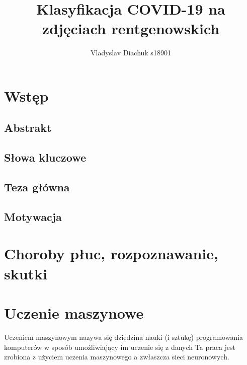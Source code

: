 \documentclass{article}
\title{Klasyfikacja COVID-19 na zdjęciach rentgenowskich}
\author{Vladyslav Diachuk s18901}
\begin{document}
\maketitle

\section{Wstęp}

\subsection{Abstrakt}


\subsection{Słowa kluczowe}


\subsection{Teza główna}

\subsection{Motywacja}


\section{Choroby płuc, rozpoznawanie, skutki}

\section{Uczenie maszynowe}
Uczeniem maszynowym nazywa się dziedzina nauki (i sztukę) programowania komputerów w sposób umożliwiający im uczenie się z danych \cite{geron} 
Ta praca jest zrobiona z użyciem uczenia maszynowego a zwłaszcza sieci neuronowych.
\end{document}
